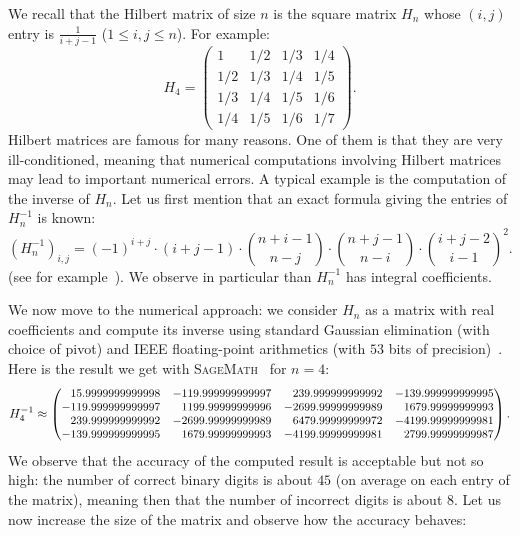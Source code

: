 \documentclass[11pt]{article}
\numberwithin{equation}{section}
\numberwithin{figure}{section}
\renewcommand{\leq}{\leqslant}
\theoremstyle{definition}
\newcommand{\sage}{\textsc{SageMath}~\cite{sage}\xspace}
\begin{document}
We recall that the Hilbert matrix of size $n$ is the square matrix $H_n$ 
whose $(i,j)$ entry is $\frac 1 {i+j-1}$ ($1 \leq i,j \leq n$). For 
example:
$$H_4 = \left( \begin{matrix}
1 & 1/2 & 1/3 & 1/4 \\
1/2 & 1/3 & 1/4 & 1/5 \\
1/3 & 1/4 & 1/5 & 1/6 \\
1/4 & 1/5 & 1/6 & 1/7 
\end{matrix}\right).$$
Hilbert matrices are famous for many reasons. One of them is that 
they are very ill-conditioned, meaning that numerical computations 
involving Hilbert matrices may lead to important numerical errors.
A typical example is the computation of the inverse of $H_n$. Let us
first mention that an exact formula giving the entries of $H_n^{-1}$
is known:
\begin{equation}
\label{eq:Hninv}
(H_n^{-1})_{i,j} = (-1)^{i+j} \cdot (i+j-1) 
\cdot \binom{n+i-1}{n-j}
\cdot \binom{n+j-1}{n-i}
\cdot \binom{i+j-2}{i-1}^2.
\end{equation}
(see for example~\cite{Ch83}).
We observe in particular than $H_n^{-1}$ has integral coefficients.

We now move to the numerical approach: we consider $H_n$ as a matrix 
with real coefficients and compute its inverse using standard Gaussian 
elimination (with choice of pivot) and IEEE floating-point arithmetics 
(with $53$ bits of precision)~\cite{IEEE08}. Here is the result we get 
with \sage for $n = 4$:
$$\small
H_4^{-1} \approx \left( \begin{matrix}
\phantom{+}15.9999999999998 & -119.999999999997 & \phantom{+}239.999999999992 & -139.999999999995 \\
-119.999999999997 & \phantom{+}1199.99999999996 & -2699.99999999989 & \phantom{+}1679.99999999993 \\
\phantom{+}239.999999999992 & -2699.99999999989 & \phantom{+}6479.99999999972 & -4199.99999999981 \\
-139.999999999995 & \phantom{+}1679.99999999993 & -4199.99999999981 & \phantom{+}2799.99999999987
\end{matrix} \right).$$
We observe that the accuracy of the computed result is acceptable but not so
high: the number of correct binary digits is about $45$ (on average 
on each entry of the matrix), meaning then that the number of incorrect 
digits is about $8$. Let us now increase the size of the matrix and observe 
how the accuracy behaves:
\end{document}
